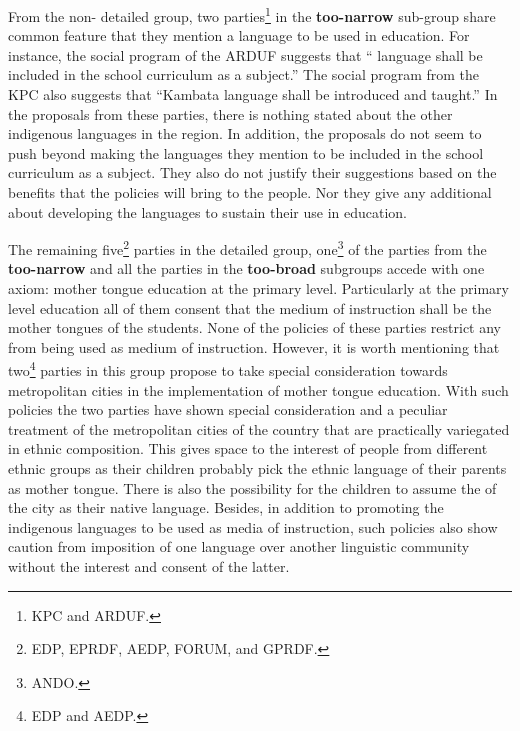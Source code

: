 \documentclass[output=paper,modfonts]{langscibook}
\begin{document}
From the non- detailed group, two parties\footnote{KPC and ARDUF.} in the \textbf{too-narrow} sub-group share common feature that they mention a language to be used in education. For instance, the social program of the ARDUF suggests that “ language shall be included in the school curriculum as a subject.”  The social program from the KPC also suggests that “Kambata language shall be introduced and taught.” In the proposals from these parties, there is nothing stated about the other indigenous languages in the region. In addition, the proposals do not seem to push beyond making the languages they mention to be included in the school curriculum as a subject. They also do not justify their suggestions based on the benefits that the policies will bring to the people. Nor they give any additional  about developing the languages to sustain their use in education.   

The remaining five\footnote{EDP, EPRDF, AEDP, FORUM, and GPRDF.} parties in the detailed group, one\footnote{ANDO.} of the parties from the \textbf{too-narrow} and all the parties in the \textbf{too-broad} subgroups accede with one axiom: mother tongue education at the primary level. Particularly at the primary level education all of them consent that the medium of instruction shall be the mother tongues of the students.  None of the policies of these parties restrict any  from being used as medium of instruction. However, it is worth mentioning that two\footnote{EDP and AEDP.} parties in this group propose to take special consideration towards metropolitan cities in the implementation of mother tongue education. With such policies the two parties have shown special consideration and a peculiar treatment of the metropolitan cities of the country that are practically variegated in ethnic composition. This gives space to the interest of people from different ethnic groups as their children probably pick the ethnic language of their parents as mother tongue. There is also the possibility for the children to assume the  of the city as their native language. Besides, in addition to promoting the indigenous languages to be used as media of instruction, such policies also show caution from imposition of one language over another linguistic community without the interest and consent of the latter. 
\end{document}
